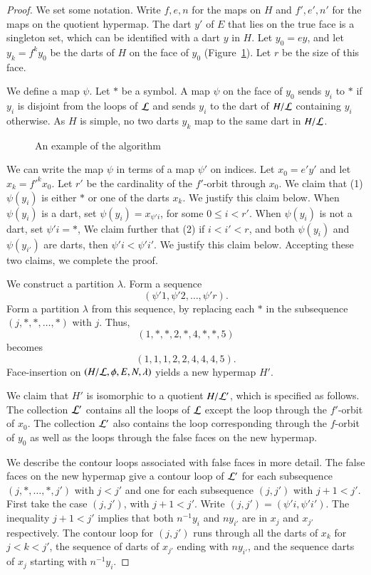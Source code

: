 \begin{proof}  We set some notation.
Write $f,e,n$ for the maps on $H$ and $f',e',n'$ for the maps on the
quotient hypermap.   
The dart $y'$ of $E$ that 
lies on the true face is a
singleton set, which can be identified with a dart $y$ in $H$.  Let
$y_0 = e y$, and let $y_k = {f}^k y_0$ be the darts of $H$ on the
face of $y_0$ (Figure~\ref{fig:algordart}).  
Let $r$ be the size of this face. 

We define a map $\psi$.
Let $*$ be a symbol.
A map
$\psi$ on the face of $y_0$ sends 
$y_i$ to $*$ if $y_i$ is disjoint from
the loops of ${\cal L}$ and sends $y_i$
to the dart of $H/{\cal L}$
containing $y_i$ otherwise.
As $H$ is simple, no two darts
$y_k$ map to the same dart in $H/{\cal L}$.
\begin{figure}[htb]
  \centering
  \caption{An example of the algorithm}
  \label{fig:algordart}
\end{figure}

We can write the map $\psi$ in terms of a map $\psi'$ on indices.
Let $x_0 = e' y'$ and let $x_k = {f'}^k x_0$.  Let $r'$ be the
cardinality of the $f'$-orbit through $x_0$.  
We claim that (1) $\psi(y_i)$ is either $*$ or one of the
darts $x_k$.  We justify this claim below.
When $\psi(y_i)$ is a dart, set $\psi(y_i) =
x_{\psi' i}$, for some $0\le i < r'$. 
When $\psi(y_i)$ is not a dart,
set $\psi' i = *$, 
We claim further that (2) if
$i< i'< r$, and both $\psi(y_i)$ and $\psi(y_{i'})$ are darts, then
$\psi' i < \psi' i'$.  We justify this claim below.
Accepting these two claims, we complete the proof.    

We construct a partition $\lambda$.
Form a sequence
    $$(\psi' 1,\psi' 2,\ldots,\psi' r).$$
Form a partition $\lambda$ from this sequence, 
by replacing each $*$ in the
subsequence $(j,*,*,\ldots,*)$ with $j$. Thus,
    $$(1,*,*,2,*,4,*,*,5)$$
becomes
    $$(1,1,1,2,2,4,4,4,5).$$
Face-insertion on $(H/{\cal L},\phi,E,N,\lambda)$ yields a new
hypermap $H'$.  

We claim that $H'$ is isomorphic to a quotient
$H/{\cal L}'$, which is specified as follows. The collection
${\cal L}'$ contains all the loops of ${\cal L}$ 
except the loop through the $f'$-orbit of $x_0$.  The collection
${\cal L}'$ also contains
the loop corresponding through the $f$-orbit
of $y_0$ as well as the loops through the false faces on
the new hypermap.  

We describe the contour loops associated with false faces 
in more detail.
The false faces on the new hypermap give a
contour loop of ${\cal L}'$ for each subsequence
$(j,*,\ldots,*,j')$ with $j< j'$ 
and one for each subsequence $(j,j')$ with
$j+1< j'$.  
First take the case $(j,j')$, with $j+1<j'$. 
Write $(j,j') = (\psi'i,\psi' i')$.
The inequality $j+1<j'$ implies that both $n^{-1}
y_i$ and $n y_{i'}$ are in $x_j$ and $x_{j'}$ respectively.
The contour loop for $(j,j')$ runs through 
all the darts of $x_k$ for $j<k<j'$,
the sequence of darts of $x_{j'}$ ending with $n y_{i'}$,
and the sequence darts of $x_j$ starting with $n^{-1} y_i$.


\end{proof}
